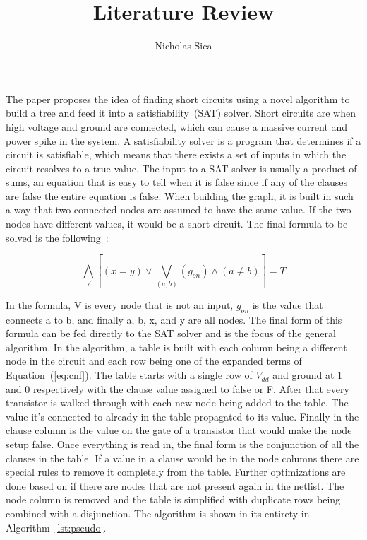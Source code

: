 \documentclass[journal,12pt]{IEEEtran}
\title{Literature Review}
\author{Nicholas Sica}
\begin{document}
\maketitle
The paper proposes the idea of finding short circuits using a novel
algorithm to build a tree and feed it into a satisfiability~(SAT)
solver. Short circuits are when high voltage and ground are
connected, which can cause a massive current and power spike in the
system. A satisfiability solver is a program that determines if a
circuit is satisfiable, which means that there exists a set of inputs
in which the circuit resolves to a true value. The input to a SAT
solver is usually a product of sums, an equation that is easy to tell
when it is false since if any of the clauses are false the entire
equation is false. When building the graph, it is built in such a way
that two connected nodes are assumed to have the same value. If the
two nodes have different values, it would be a short circuit. The
final formula to be solved is the following~\cite{paper}:

\begin{equation}\label{eq:cnf}
  \bigwedge\limits_{V} [(x = y) \lor \bigvee\limits_{(a,b)} (g_{on}) \land (a \neq b)] = T
\end{equation}

In the formula, V is every node that is not an input, $g_{on}$ is the
value that connects a to b, and finally a, b, x, and y are all
nodes. The final form of this formula can be fed directly to the SAT
solver and is the focus of the general algorithm. In the algorithm, a
table is built with each column being a different node in the circuit
and each row being one of the expanded terms of Equation~(\ref{eq:cnf}). The
table starts with a single row of $V_{dd}$ and ground at 1 and 0
respectively with the clause value assigned to false or F. After that every
transistor is walked through with each new node being added to the
table. The value it's connected to already in the table propagated to
its value. Finally in the clause column is the value on the gate of a
transistor that would make the node setup false. Once
everything is read in, the final form is the conjunction of all the
clauses in the table. If a value in a clause would be in the node
columns there are special rules to remove it completely from the
table. Further optimizations are done based on if there are nodes that
are not present again in the netlist. The node column is removed and
the table is simplified with duplicate rows being combined with a
disjunction. The algorithm is shown in its entirety
in Algorithm~\ref{lst:pseudo}.
\end{document}
